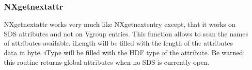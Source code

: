 \documentclass[12pt]{article}
\begin{document}
\subsubsection{NXgetnextattr}
NXgetnextattr works very much like NXgetnextentry except, that it works on
SDS attributes and not on Vgroup entries. This function allows to scan the
names of attributes available. iLength will be filled with the length of the
attributes data in byte. iType will be filled with the HDF type of the
attribute. Be warned: this routine returns global attributes when no SDS is
currently open.

\begin{flushleft} \small
\begin{minipage}{\linewidth} \label{scrap22}
\vspace{-1ex}
\begin{list}{}{} \item
\mbox{}\verb@@\\
\mbox{}\verb@/*-------------------------------------------------------------------------*/@\\
\mbox{}\verb@  NXstatus  NXgetnextattr(NXhandle fileid, NXname pName, @\\
\mbox{}\verb@                          int *iLength, int *iType)@\\
\mbox{}\verb@  {@\\
\mbox{}\verb@     pNexusFile pFile;@\\
\mbox{}\verb@     int iRet;@\\
\mbox{}\verb@     int32 iPType, iCount;@\\
\mbox{}\verb@@\\
\mbox{}\verb@     pFile = NXIassert(fileid);@\\
\mbox{}\verb@@\\
\mbox{}\verb@     /* first check if we have to start a new attribute search */@\\
\mbox{}\verb@     if(pFile->iNDir == 0) @\\
\mbox{}\verb@     {@\\
\mbox{}\verb@        iRet = NXIInitAttDir(pFile);@\\
\mbox{}\verb@        if(iRet == NX_ERROR)@\\
\mbox{}\verb@        {@\\
\mbox{}\verb@           return NX_ERROR;@\\
\mbox{}\verb@        }@\\
\mbox{}\verb@     }@\\
\mbox{}\verb@     @\\

\end{list}
\end{minipage}
\end{flushleft}
\end{document}
